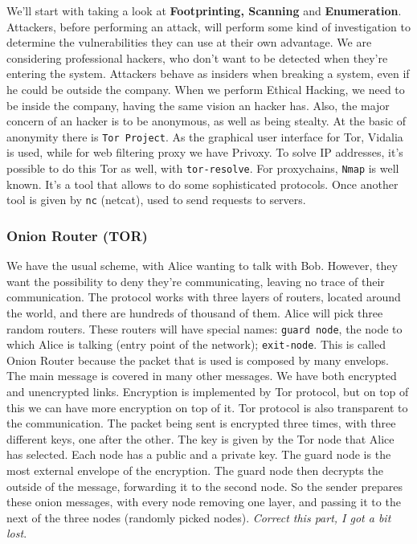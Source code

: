 We'll start with taking a look at \textbf{Footprinting, Scanning} and 
\textbf{Enumeration}. \newline
\newline Attackers, before performing an attack, will perform 
some kind of investigation to determine the vulnerabilities
they can use at their own advantage. We are considering 
professional hackers, who don't want to be detected 
when they're entering the system. \newline 
Attackers behave as insiders when breaking a system, even 
if he could be outside the company. When we perform 
Ethical Hacking, we need to be inside the company, having
the same vision an hacker has. \newline 
Also, the major concern of an hacker is to be anonymous, 
as well as being stealty. At the basic of anonymity there 
is \texttt{Tor Project}. As the graphical user interface
for Tor, Vidalia is used, while for web filtering proxy
we have Privoxy. To solve IP addresses, it's possible to 
do this Tor as well, with \texttt{tor-resolve}. 
For proxychains, \texttt{Nmap} is well known. It's a tool 
that allows to do some sophisticated protocols. Once another 
tool is given by \texttt{nc} (netcat), used to send 
requests to servers. 

\subsubsection{Onion Router (TOR)}
We have the usual scheme, with Alice wanting to talk with 
Bob. However, they want the possibility to deny they're
communicating, leaving no trace of their communication.
The protocol works with three layers of routers, 
located around the world, and there are hundreds of thousand 
of them. Alice will pick three random routers. These 
routers will have special names: \texttt{guard node}, the 
node to which Alice is talking (entry point of the network);
\texttt{exit-node}. This is called Onion Router because 
the packet that is used is composed by many envelops. 
The main message is covered in many other messages. 
We have both encrypted and unencrypted links. 
Encryption is implemented by Tor protocol, but on top 
of this we can have more encryption on top of it. 
Tor protocol is also transparent to the communication. 
The packet being sent is encrypted three times, with three 
different keys, one after the other. The key is given 
by the Tor node that Alice has selected. Each node has 
a public and a private key. The guard node is the most 
external envelope of the encryption. The guard node then 
decrypts the outside of the message, forwarding it to the 
second node. \newline
So the sender prepares these onion messages, with every node 
removing one layer, and passing it to the next of the three 
nodes (randomly picked nodes). \newline
\textit{Correct this part, I got a bit lost}. 

